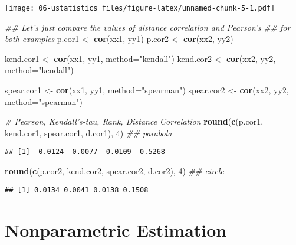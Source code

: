 \documentclass[]{book}
\newenvironment{Shaded}{\begin{snugshade}}{\end{snugshade}}
\newcommand{\CommentTok}[1]{\textcolor[rgb]{0.56,0.35,0.01}{\textit{#1}}}
\newcommand{\DataTypeTok}[1]{\textcolor[rgb]{0.13,0.29,0.53}{#1}}
\newcommand{\DecValTok}[1]{\textcolor[rgb]{0.00,0.00,0.81}{#1}}
\newcommand{\KeywordTok}[1]{\textcolor[rgb]{0.13,0.29,0.53}{\textbf{#1}}}
\newcommand{\NormalTok}[1]{#1}
\newcommand{\StringTok}[1]{\textcolor[rgb]{0.31,0.60,0.02}{#1}}
\begin{document}
\texttt{[image: 06-ustatistics\_files/figure-latex/unnamed-chunk-5-1.pdf]}

\begin{Shaded}
\begin{Highlighting}[]
\CommentTok{## Let's just compare the values of distance correlation and Pearson's }
\CommentTok{## for both examples }
\NormalTok{p.cor1 <-}\StringTok{ }\KeywordTok{cor}\NormalTok{(xx1, yy1)}
\NormalTok{p.cor2 <-}\StringTok{ }\KeywordTok{cor}\NormalTok{(xx2, yy2)}

\NormalTok{kend.cor1 <-}\StringTok{ }\KeywordTok{cor}\NormalTok{(xx1, yy1, }\DataTypeTok{method=}\StringTok{"kendall"}\NormalTok{) }
\NormalTok{kend.cor2 <-}\StringTok{ }\KeywordTok{cor}\NormalTok{(xx2, yy2, }\DataTypeTok{method=}\StringTok{"kendall"}\NormalTok{)}

\NormalTok{spear.cor1 <-}\StringTok{ }\KeywordTok{cor}\NormalTok{(xx1, yy1, }\DataTypeTok{method=}\StringTok{"spearman"}\NormalTok{) }
\NormalTok{spear.cor2 <-}\StringTok{ }\KeywordTok{cor}\NormalTok{(xx2, yy2, }\DataTypeTok{method=}\StringTok{"spearman"}\NormalTok{)}

\CommentTok{# Pearson, Kendall's-tau, Rank, Distance Correlation}
\KeywordTok{round}\NormalTok{(}\KeywordTok{c}\NormalTok{(p.cor1, kend.cor1, spear.cor1, d.cor1), }\DecValTok{4}\NormalTok{) }\CommentTok{## parabola}
\end{Highlighting}
\end{Shaded}

\begin{verbatim}
## [1] -0.0124  0.0077  0.0109  0.5268
\end{verbatim}

\begin{Shaded}
\begin{Highlighting}[]
\KeywordTok{round}\NormalTok{(}\KeywordTok{c}\NormalTok{(p.cor2, kend.cor2, spear.cor2, d.cor2), }\DecValTok{4}\NormalTok{) }\CommentTok{## circle}
\end{Highlighting}
\end{Shaded}

\begin{verbatim}
## [1] 0.0134 0.0041 0.0138 0.1508
\end{verbatim}

\hypertarget{part-nonparametric-estimation}{%
\part{Nonparametric Estimation}\label{part-nonparametric-estimation}}
\end{document}
